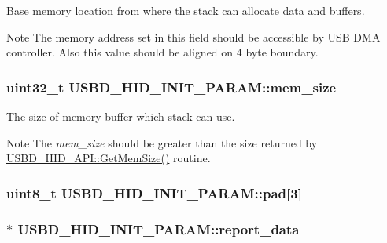Base memory location from where the stack can allocate data and buffers. \begin{DoxyNote}{Note}
The memory address set in this field should be accessible by U\-S\-B D\-M\-A controller. Also this value should be aligned on 4 byte boundary. 
\end{DoxyNote}
\hypertarget{structUSBD__HID__INIT__PARAM_a79aeddb1f4f4c9d77cacd17cf6c26499}{
\subsubsection[{mem\-\_\-size}]{\setlength{\rightskip}{0pt plus 5cm}uint32\-\_\-t U\-S\-B\-D\-\_\-\-H\-I\-D\-\_\-\-I\-N\-I\-T\-\_\-\-P\-A\-R\-A\-M\-::mem\-\_\-size}}\label{structUSBD__HID__INIT__PARAM_a79aeddb1f4f4c9d77cacd17cf6c26499}
The size of memory buffer which stack can use. \begin{DoxyNote}{Note}
The {\itshape mem\-\_\-size} should be greater than the size returned by \hyperlink{structUSBD__HID__API_a020839a4e29677899bb7a0a2c11b1252}{U\-S\-B\-D\-\_\-\-H\-I\-D\-\_\-\-A\-P\-I\-::\-Get\-Mem\-Size()} routine. 
\end{DoxyNote}
\hypertarget{structUSBD__HID__INIT__PARAM_abe66157322df2a9f655708b8ae2795e9}{
\subsubsection[{pad}]{\setlength{\rightskip}{0pt plus 5cm}uint8\-\_\-t U\-S\-B\-D\-\_\-\-H\-I\-D\-\_\-\-I\-N\-I\-T\-\_\-\-P\-A\-R\-A\-M\-::pad\mbox{[}3\mbox{]}}}\label{structUSBD__HID__INIT__PARAM_abe66157322df2a9f655708b8ae2795e9}
\hypertarget{structUSBD__HID__INIT__PARAM_a2e46476d82b7859a239feeadf457d0e8}{
\subsubsection[{report\-\_\-data}]{$\ast$ U\-S\-B\-D\-\_\-\-H\-I\-D\-\_\-\-I\-N\-I\-T\-\_\-\-P\-A\-R\-A\-M\-::report\-\_\-data}}\label{structUSBD__HID__INIT__PARAM_a2e46476d82b7859a239feeadf457d0e8}
